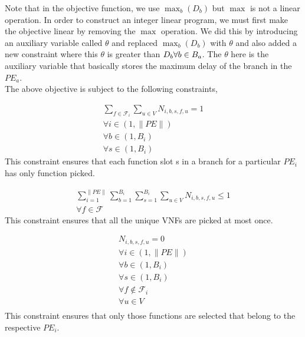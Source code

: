 \documentclass[journal]{IEEEtran}
\begin{document}
Note that in the objective function, we use $\max_b ( D_b )$ but $\max$ is not a linear operation. In order to construct an integer linear program, we must first make the objective linear by removing the $\max$ operation. We did this by introducing an auxiliary variable called $\theta$ and replaced
$\max_b ( D_b )$ with $\theta$ and also added a new constraint where this $\theta$ is greater than $D_b \space \forall b \in B_a$. The $\theta$ here is the auxiliary variable that basically stores the maximum delay of the branch in the $PE_a$.\\ 
The above objective is subject to the following constraints,

\begin{equation}
\begin{split}
    \sum_{f \in \mathcal{F}_i} \sum_{u \in V} N_{i,b,s,f,u} = 1 \\
    \forall i \in (1,\lVert PE \rVert)\\
    \forall b \in (1,B_i)\\
    \forall s \in (1,B_i)
\end{split}
\end{equation}
This constraint ensures that each function slot s in a branch for a particular $PE_i$ has only function picked.

\begin{equation}
\begin{split}
    \sum_{i=1}^{\lVert PE \rVert} \sum_{b=1}^{B_i} \sum_{s=1}^{B_i} \sum_{u \in V} N_{i,b,s,f,u} \leq 1 \\
    \forall f \in \mathcal{F}
\end{split}
\end{equation}
This constraint ensures that all the unique VNFs are picked at most once. 

\begin{equation}
\begin{split}
    N_{i,b,s,f,u} = 0 \\
    \forall i \in (1,\lVert PE \rVert)\\
    \forall b \in (1,B_i)\\
    \forall s \in (1,B_i) \\
    \forall f \notin \mathcal{F}_i\\
    \forall u  \in V\\
\end{split}
\end{equation}
This constraint ensures that only those functions are selected that belong to the respective $PE_i$.
\end{document}
